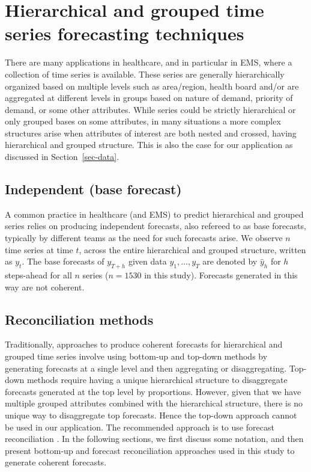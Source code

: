 \documentclass[
  authoryear,
  preprint,
  3p]{elsarticle}
\begin{document}
\section{Hierarchical and grouped time series forecasting
techniques}\label{sec-htc}

There are many applications in healthcare, and in particular in EMS,
where a collection of time series is available. These series are
generally hierarchically organized based on multiple levels such as
area/region, health board and/or are aggregated at different levels in
groups based on nature of demand, priority of demand, or some other
attributes. While series could be strictly hierarchical or only grouped
bases on some attributes, in many situations a more complex structures
arise when attributes of interest are both nested and crossed, having
hierarchical and grouped structure. This is also the case for our
application as discussed in Section~\ref{sec-data}.

\subsection{Independent (base
forecast)}\label{independent-base-forecast}

A common practice in healthcare (and EMS) to predict hierarchical and
grouped series relies on producing independent forecasts, also refereed
to as base forecasts, typically by different teams as the need for such
forecasts arise. We observe \(n\) time series at time \(t\), across the
entire hierarchical and grouped structure, written as \(y_t\). The base
forecasts of \(y_{T+h}\) given data \(y_1,\dots,y_T\) are denoted by
\(\hat{y}_h\) for \(h\) steps-ahead for all \(n\) series (\(n=1530\) in
this study). Forecasts generated in this way are not coherent.

\subsection{Reconciliation methods}\label{reconciliation-methods}

Traditionally, approaches to produce coherent forecasts for hierarchical
and grouped time series involve using bottom-up and top-down methods by
generating forecasts at a single level and then aggregating or
disaggregating. Top-down methods require having a unique hierarchical
structure to disaggregate forecasts generated at the top level by
proportions. However, given that we have multiple grouped attributes
combined with the hierarchical structure, there is no unique way to
disaggregate top forecasts. Hence the top-down approach cannot be used
in our application. The recommended approach is to use forecast
reconciliation \citep{hyndman2011optimal}. In the following sections, we
first discuss some notation, and then present bottom-up and forecast
reconciliation approaches used in this study to generate coherent
forecasts.
\end{document}
